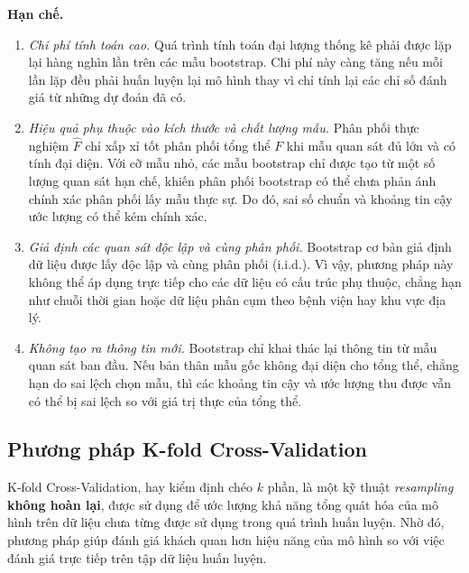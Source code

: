 \documentclass[14pt,a4paper]{extarticle}\usepackage[]{graphicx}\usepackage[]{xcolor}
\begin{document}
\textbf{Hạn chế.}
\begin{enumerate}
  \item \emph{Chi phí tính toán cao.} Quá trình tính toán đại lượng thống kê
        phải được lặp lại hàng nghìn lần trên các mẫu bootstrap. Chi phí này
        càng tăng nếu mỗi lần lặp đều phải huấn luyện lại mô hình thay vì chỉ
        tính lại các chỉ số đánh giá từ những dự đoán đã có.

  \item \emph{Hiệu quả phụ thuộc vào kích thước và chất lượng mẫu.}
        Phân phối thực nghiệm $\hat{F}$ chỉ xấp xỉ tốt phân phối tổng thể $F$
        khi mẫu quan sát đủ lớn và có tính đại diện. Với cỡ mẫu nhỏ, các mẫu
        bootstrap chỉ được tạo từ một số lượng quan sát hạn chế, khiến phân
        phối bootstrap có thể chưa phản ánh chính xác phân phối lấy mẫu thực
        sự. Do đó, sai số chuẩn và khoảng tin cậy ước lượng có thể kém chính
        xác.

  \item \emph{Giả định các quan sát độc lập và cùng phân phối.} Bootstrap cơ
        bản giả định dữ liệu được lấy độc lập và cùng phân phối (i.i.d.). Vì
        vậy, phương pháp này không thể áp dụng trực tiếp cho các dữ liệu có
        cấu trúc phụ thuộc, chẳng hạn như chuỗi thời gian hoặc dữ liệu phân
        cụm theo bệnh viện hay khu vực địa lý.

  \item \emph{Không tạo ra thông tin mới.} Bootstrap chỉ khai thác lại thông
        tin từ mẫu quan sát ban đầu. Nếu bản thân mẫu gốc không đại diện cho
        tổng thể, chẳng hạn do sai lệch chọn mẫu, thì các khoảng tin cậy và
        ước lượng thu được vẫn có thể bị sai lệch so với giá trị thực của
        tổng thể.
\end{enumerate}

\subsection{Phương pháp K-fold Cross-Validation}

K-fold Cross-Validation, hay kiểm định chéo $k$ phần, là một kỹ thuật
\emph{resampling} \textbf{không hoàn lại}, được sử dụng để ước lượng khả
năng tổng quát hóa của mô hình trên dữ liệu chưa từng được sử dụng trong quá
trình huấn luyện. Nhờ đó, phương pháp giúp đánh giá khách quan hơn hiệu năng
của mô hình so với việc đánh giá trực tiếp trên tập dữ liệu huấn luyện.
\end{document}
